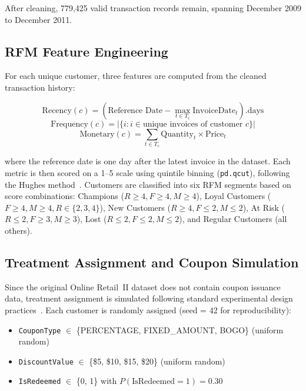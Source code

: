 \documentclass[11pt,a4paper,twoside]{article}
\begin{document}
After cleaning, 779,425 valid transaction records remain, spanning December 2009 to December 2011.

\subsection{RFM Feature Engineering}

For each unique customer, three features are computed from the cleaned transaction history:

\begin{equation}
\text{Recency}(c) = (\text{Reference Date} - \max_{t \in T_c} \text{InvoiceDate}_t).\text{days}
\label{eq:recency}
\end{equation}
\begin{equation}
\text{Frequency}(c) = |\{i : i \in \text{unique invoices of customer } c\}|
\label{eq:frequency}
\end{equation}
\begin{equation}
\text{Monetary}(c) = \sum_{t \in T_c} \text{Quantity}_t \times \text{Price}_t
\label{eq:monetary}
\end{equation}

where the reference date is one day after the latest invoice in the dataset. Each metric is then scored on a 1--5 scale using quintile binning (\texttt{pd.qcut}), following the Hughes method~\cite{hughes1994}. Customers are classified into six RFM segments based on score combinations: Champions ($R \geq 4, F \geq 4, M \geq 4$), Loyal Customers ($F \geq 4, M \geq 4, R \in \{2,3,4\}$), New Customers ($R \geq 4, F \leq 2, M \leq 2$), At Risk ($R \leq 2, F \geq 3, M \geq 3$), Lost ($R \leq 2, F \leq 2, M \leq 2$), and Regular Customers (all others).

\subsection{Treatment Assignment and Coupon Simulation}

Since the original Online Retail~II dataset does not contain coupon issuance data, treatment assignment is simulated following standard experimental design practices~\cite{rubin1974}. Each customer is randomly assigned (seed = 42 for reproducibility):

\begin{itemize}
    \item \texttt{CouponType} $\in$ \{PERCENTAGE, FIXED\_AMOUNT, BOGO\} (uniform random)
    \item \texttt{DiscountValue} $\in$ \{\$5, \$10, \$15, \$20\} (uniform random)
    \item \texttt{IsRedeemed} $\in$ \{0, 1\} with $P(\text{IsRedeemed}=1) = 0.30$
\end{itemize}
\end{document}
